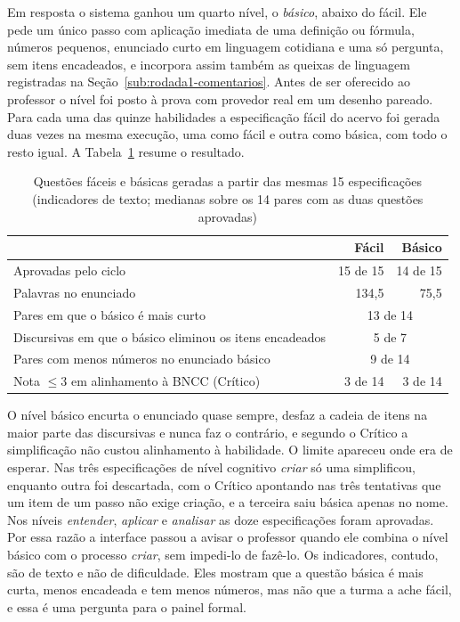 Em resposta o sistema ganhou um quarto nível, o \emph{básico}, abaixo do fácil. Ele pede um único
passo com aplicação imediata de uma definição ou fórmula, números pequenos, enunciado curto em
linguagem cotidiana e uma só pergunta, sem itens encadeados, e incorpora assim também as queixas de
linguagem registradas na Seção~\ref{sub:rodada1-comentarios}. Antes de ser oferecido ao professor
o nível foi posto à prova com provedor real em um desenho pareado. Para cada uma das quinze
habilidades a especificação fácil do acervo foi gerada duas vezes na mesma execução, uma como fácil
e outra como básica, com todo o resto igual. A Tabela~\ref{tab:basico} resume o resultado.

\begin{table}[htbp]
  \centering
  \caption{Questões fáceis e básicas geradas a partir das mesmas 15 especificações
  (indicadores de texto; medianas sobre os 14 pares com as duas questões aprovadas)}
  \label{tab:basico}
  \begin{tabular}{lrr}
    \toprule
    & Fácil & Básico \\
    \midrule
    Aprovadas pelo ciclo & 15 de 15 & 14 de 15 \\
    Palavras no enunciado & 134,5 & 75,5 \\
    Pares em que o básico é mais curto & \multicolumn{2}{c}{13 de 14} \\
    Discursivas em que o básico eliminou os itens encadeados & \multicolumn{2}{c}{5 de 7} \\
    Pares com menos números no enunciado básico & \multicolumn{2}{c}{9 de 14} \\
    Nota $\le 3$ em alinhamento à BNCC (Crítico) & 3 de 14 & 3 de 14 \\
    \bottomrule
  \end{tabular}
\end{table}

O nível básico encurta o enunciado quase sempre, desfaz a cadeia de itens na maior parte das
discursivas e nunca faz o contrário, e segundo o Crítico a simplificação não custou alinhamento à
habilidade. O limite apareceu onde era de esperar. Nas três especificações de nível cognitivo
\emph{criar} só uma simplificou, enquanto outra foi descartada, com o Crítico apontando nas três
tentativas que um item de um passo não exige criação, e a terceira saiu básica apenas no nome. Nos
níveis \emph{entender}, \emph{aplicar} e \emph{analisar} as doze especificações foram aprovadas. Por
essa razão a interface passou a avisar o professor quando ele combina o nível básico com o processo
\emph{criar}, sem impedi-lo de fazê-lo. Os indicadores, contudo, são de texto e não de dificuldade.
Eles mostram que a questão básica é mais curta, menos encadeada e tem menos números, mas não que a
turma a ache fácil, e essa é uma pergunta para o painel formal.


